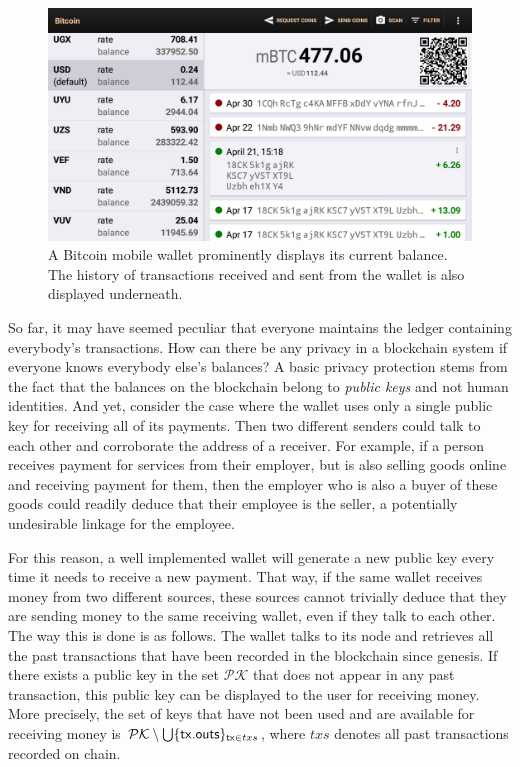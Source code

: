 \begin{figure}[h]
  \centering
  \includegraphics[width=0.9 \columnwidth,keepaspectratio]{figures/wallet-balance.png}
  \caption{A Bitcoin mobile wallet prominently displays its current balance. The history of transactions
           received and sent from the wallet is also displayed underneath.}
  \label{fig.wallet-balance}
\end{figure}

So far, it may have seemed peculiar that everyone maintains the ledger containing everybody's transactions.
How can there be any privacy in a blockchain system if everyone knows everybody else's balances? A basic
privacy protection stems from the fact that the balances on the blockchain belong to \emph{public keys}
and not human identities. And yet, consider the case where the wallet uses only a single public key for
receiving all of its payments. Then two different senders could talk to each other and corroborate the
address of a receiver. For example, if a person receives payment for services from their employer, but is
also selling goods online and receiving payment for them, then the employer who is also a buyer of these
goods could readily deduce that their employee is the seller, a potentially undesirable linkage for the
employee.

For this reason, a well implemented wallet will generate a new public key
every time it needs to receive a new payment. That way, if the same wallet receives money from two different
sources, these sources cannot trivially deduce that they are sending money to the same receiving wallet, even
if they talk to each other. The way this is done is as follows. The wallet talks to its node and retrieves
all the past transactions that have been recorded in the blockchain since genesis. If there exists a public key in the set
$\mathcal{PK}$ that does not appear in any past transaction, this public key can be displayed to the user for
receiving money. More precisely, the set of keys that have not been used and are available for receiving money
is $\mathcal{PK} \setminus \bigcup \{ \mathsf{tx}\textsf{.outs} \}_{\mathsf{tx} \in txs}$, where $txs$ denotes all past transactions
recorded on chain.

